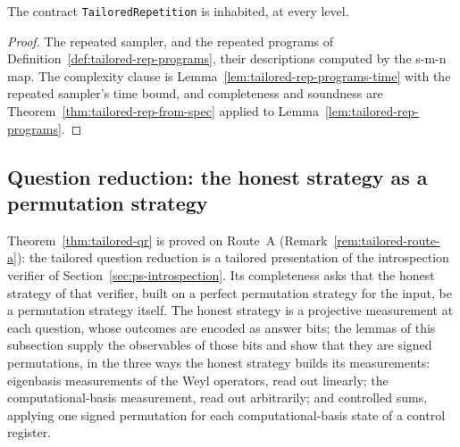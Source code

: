 \begin{theorem}
\label{thm:tailored-rep}
\leanok
The contract \texttt{TailoredRepetition} is inhabited, at every level.
\end{theorem}

\begin{proof}
\leanok
The repeated sampler, and the repeated programs of Definition~\ref{def:tailored-rep-programs},
their descriptions computed by the s-m-n map. The complexity clause is
Lemma~\ref{lem:tailored-rep-programs-time} with the repeated sampler's time bound, and
completeness and soundness are Theorem~\ref{thm:tailored-rep-from-spec} applied to
Lemma~\ref{lem:tailored-rep-programs}.
\end{proof}

\subsection{Question reduction: the honest strategy as a permutation strategy}

Theorem~\ref{thm:tailored-qr} is proved on Route~A (Remark~\ref{rem:tailored-route-a}): the
tailored question reduction is a tailored presentation of the introspection verifier of
Section~\ref{sec:ps-introspection}. Its completeness asks that the honest strategy of that
verifier, built on a perfect permutation strategy for the input, be a permutation strategy
itself. The honest strategy is a projective measurement at each question, whose outcomes are
encoded as answer bits; the lemmas of this subsection supply the observables of those bits and
show that they are signed permutations, in the three ways the honest strategy builds its
measurements: eigenbasis measurements of the Weyl operators, read out linearly; the
computational-basis measurement, read out arbitrarily; and controlled sums, applying one
signed permutation for each computational-basis state of a control register.

